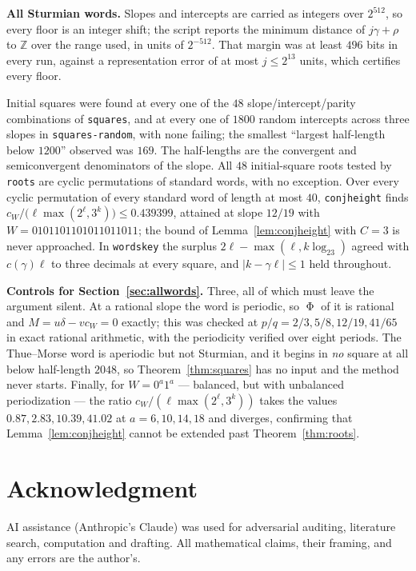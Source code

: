 \documentclass[11pt,reqno]{amsart}
\theoremstyle{plain}
\theoremstyle{definition}
\newcommand{\Z}{\mathbb{Z}}
\DeclareMathOperator{\Ph}{\Phi}
\begin{document}
\medskip
\noindent\textbf{All Sturmian words.} Slopes and intercepts are carried as
integers over $2^{512}$, so every floor is an integer shift; the script reports
the minimum distance of $j\gamma+\rho$ to $\Z$ over the range used, in units of
$2^{-512}$. That margin was at least $496$ bits in every run, against a
representation error of at most $j\le2^{13}$ units, which certifies every floor.

Initial squares were found at every one of the $48$ slope/intercept/parity
combinations of \texttt{squares}, and at every one of $1800$ random intercepts
across three slopes in \texttt{squares-random}, with none failing; the smallest
``largest half-length below $1200$'' observed was $169$. The half-lengths are
the convergent and semiconvergent denominators of the slope. All $48$
initial-square roots tested by \texttt{roots} are cyclic permutations of
standard words, with no exception. Over every cyclic permutation of every
standard word of length at most $40$, \texttt{conjheight} finds
$c_W/\bigl(\ell\max(2^{\ell},3^{k})\bigr)\le0.439399$, attained at slope
$12/19$ with $W=0101101101011011011$; the bound of
Lemma~\ref{lem:conjheight} with $C=3$ is never approached. In
\texttt{wordskey} the surplus $2\ell-\max(\ell,k\log_23)$ agreed with
$c(\gamma)\ell$ to three decimals at every square, and $|k-\gamma\ell|\le1$
held throughout.

\medskip
\noindent\textbf{Controls for Section~\ref{sec:allwords}.} Three, all of which
must leave the argument silent. At a rational slope the word is periodic, so
$\Ph$ of it is rational and $M=u\delta-vc_W=0$ exactly; this was checked at
$p/q=2/3,5/8,12/19,41/65$ in exact rational arithmetic, with the periodicity
verified over eight periods. The Thue--Morse word is aperiodic but not
Sturmian, and it begins in \emph{no} square at all below half-length $2048$, so
Theorem~\ref{thm:squares} has no input and the method never starts. Finally, for
$W=0^{a}1^{a}$ --- balanced, but with unbalanced periodization --- the ratio
$c_W/(\ell\max(2^{\ell},3^{k}))$ takes the values $0.87,2.83,10.39,41.02$ at
$a=6,10,14,18$ and diverges, confirming that Lemma~\ref{lem:conjheight} cannot
be extended past Theorem~\ref{thm:roots}.

\section*{Acknowledgment}

AI assistance (Anthropic's Claude) was used for adversarial auditing, literature
search, computation and drafting. All mathematical claims, their framing, and any
errors are the author's.



\end{document}
